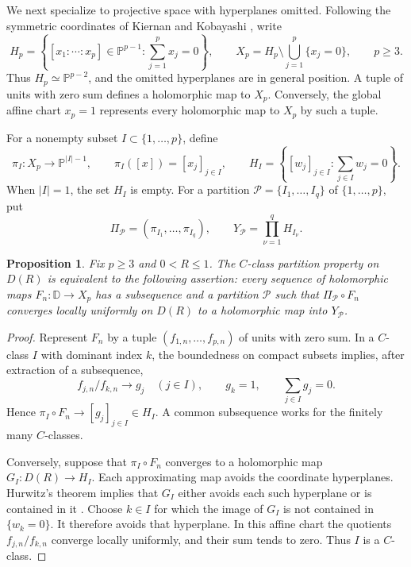 \documentclass[12pt,letterpaper,reqno]{amsart}
\newtheorem{prop}[thm]{Proposition}
\theoremstyle{definition}
\numberwithin{equation}{section}
\newcommand{\D}{\mathbb D}
\begin{document}
	We next specialize to projective space with hyperplanes omitted.
	Following the symmetric coordinates of Kiernan and Kobayashi
	\cite[pp.~208--209]{KK73}, write
	\[
	H_p=\left\{[x_1:\cdots:x_p]\in\mathbb P^{p-1}:
	\sum_{j=1}^p x_j=0\right\},
	\qquad
	X_p=H_p\setminus\bigcup_{j=1}^p\{x_j=0\},
	\qquad p\ge3.
	\]
	Thus $H_p\simeq\mathbb P^{p-2}$, and the omitted hyperplanes are in
	general position. A tuple of units with zero sum defines a
	holomorphic map to $X_p$. Conversely, the global affine chart
	$x_p=1$ represents every holomorphic map to $X_p$ by such a tuple.
	
	For a nonempty subset $I\subset\{1,\ldots,p\}$, define
	\[
	\pi_I:X_p\longrightarrow\mathbb P^{|I|-1},\qquad
	\pi_I([x])=[x_j]_{j\in I},
	\qquad
	H_I=\left\{[w_j]_{j\in I}:\sum_{j\in I}w_j=0\right\}.
	\]
	When $|I|=1$, the set $H_I$ is empty. For a partition
	$\mathcal P=\{I_1,\ldots,I_q\}$ of $\{1,\ldots,p\}$, put
	\[
	\Pi_{\mathcal P}=(\pi_{I_1},\ldots,\pi_{I_q}),
	\qquad Y_{\mathcal P}=\prod_{\nu=1}^qH_{I_\nu}.
	\]
	
	\begin{prop}\label{prop:projective-equivalence}
		Fix $p\ge3$ and $0<R\le1$. The $C$-class partition property on
		$D(R)$ is equivalent to the following assertion: every sequence of
		holomorphic maps $F_n:\D\to X_p$ has a subsequence and a partition
		$\mathcal P$ such that $\Pi_{\mathcal P}\circ F_n$ converges locally
		uniformly on $D(R)$ to a holomorphic map into $Y_{\mathcal P}$.
	\end{prop}
	
	\begin{proof}
		Represent $F_n$ by a tuple $(f_{1,n},\ldots,f_{p,n})$ of units with
		zero sum. In a $C$-class $I$ with dominant index $k$, the boundedness
		on compact subsets
		implies, after extraction of a subsequence,
		\[
		f_{j,n}/f_{k,n}\longrightarrow g_j\quad(j\in I),
		\qquad g_k=1,
		\qquad \sum_{j\in I}g_j=0.
		\]
		Hence $\pi_I\circ F_n\to[g_j]_{j\in I}\in H_I$. A common
		subsequence works for the finitely many $C$-classes.
		
		Conversely, suppose that $\pi_I\circ F_n$ converges to a holomorphic
		map $G_I:D(R)\to H_I$. Each approximating map avoids the coordinate
		hyperplanes. Hurwitz's theorem implies that $G_I$ either avoids each
		such hyperplane or is contained in it
		\cite[Proposition~2, pp.~204--205]{KK73}. Choose $k\in I$ for which the
		image of $G_I$ is not contained in $\{w_k=0\}$. It therefore avoids
		that hyperplane. In this affine chart the quotients
		$f_{j,n}/f_{k,n}$ converge locally uniformly, and their sum tends to
		zero. Thus $I$ is a $C$-class.
	\end{proof}
	
\end{document}
